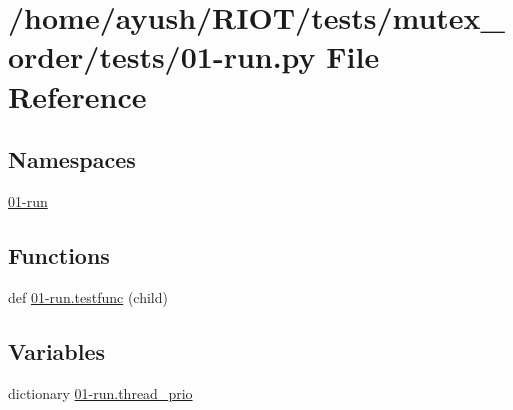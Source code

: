 \hypertarget{mutex__order_2tests_201-run_8py}{}\section{/home/ayush/\+R\+I\+O\+T/tests/mutex\+\_\+order/tests/01-\/run.py File Reference}
\label{mutex__order_2tests_201-run_8py}
\subsection*{Namespaces}
\begin{DoxyCompactItemize}
\item 
 \hyperlink{namespace01-run}{01-\/run}
\end{DoxyCompactItemize}
\subsection*{Functions}
\begin{DoxyCompactItemize}
\item 
def \hyperlink{namespace01-run_aff983ffd4ab0e6bf8e7e58970e4a10bb}{01-\/run.\+testfunc} (child)
\end{DoxyCompactItemize}
\subsection*{Variables}
\begin{DoxyCompactItemize}
\item 
dictionary \hyperlink{namespace01-run_ad18970d15e0c79d88628872c2240e455}{01-\/run.\+thread\+\_\+prio}
\end{DoxyCompactItemize}
